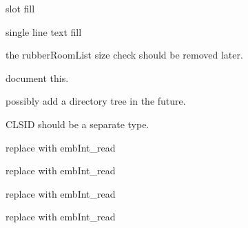 \begin{DoxyRefList}
\label{todo__todo000149}%
%
slot fill  
\item[Member \mbox{\hyperlink{imgui__main_8c_a551fa26c5cb41765c5da55164b8d74d1}{add\+\_\+text\+\_\+single}} (const char $\ast$str, Emb\+Real x, Emb\+Real y, Emb\+Real rot, bool fill, int rubber\+Mode)]\label{todo__todo000188}%
%
single line text fill  
\item[Member \mbox{\hyperlink{imgui__main_8c_ae7e67339f8e559559f7b1940ed36e1b6}{allow\+\_\+rubber}} (void)]\label{todo__todo000041}%
%
the rubber\+Room\+List size check should be removed later.  
\item[Member \mbox{\hyperlink{imgui__main_8c_a6a745fd92d172c4c2b1713493871e4de}{background\+\_\+color\+\_\+action}} (void)]\label{todo__todo000126}%
%
document this.  
\item[Member \mbox{\hyperlink{embroidery__internal_8h_a5e0de54ec0ef10b88a4e499bbe94f869}{bcf\+\_\+directory}} ]\label{todo__todo000229}%
%
possibly add a directory tree in the future.  
\item[Member \mbox{\hyperlink{embroidery__internal_8h_a5226ee18f1045aa203f53da9b74d6963}{bcf\+\_\+file\+\_\+header}} ]\label{todo__todo000230}%
%
CLSID should be a separate type.  
\item[Member \mbox{\hyperlink{formats_8c_acaa069d2e820245be0f711415e2c297d}{binary\+Write\+Int}} (FILE $\ast$f, int data)]\label{todo__todo000245}%
%
replace with emb\+Int\+\_\+read  
\item[Member \mbox{\hyperlink{formats_8c_ad608ccee7fa2036aeba8500061ea0824}{binary\+Write\+Int\+BE}} (FILE $\ast$f, int data)]\label{todo__todo000246}%
%
replace with emb\+Int\+\_\+read  
\item[Member \mbox{\hyperlink{formats_8c_ab2256826c6ea8d2374fc94df46a7616f}{binary\+Write\+Short}} (FILE $\ast$f, short data)]\label{todo__todo000242}%
%
replace with emb\+Int\+\_\+read  
\item[Member \mbox{\hyperlink{formats_8c_ad56027171faded451118350359c1e8ae}{binary\+Write\+UInt}} (FILE $\ast$f, unsigned int data)]\label{todo__todo000247}%
%
replace with emb\+Int\+\_\+read  
\item[Member \mbox{\hyperlink{formats_8c_a152fc4262fce475f30786312da68fad6}{binary\+Write\+UInt\+BE}} (FILE $\ast$f, unsigned int data)]\label{todo__todo000248}%

\end{DoxyRefList}
